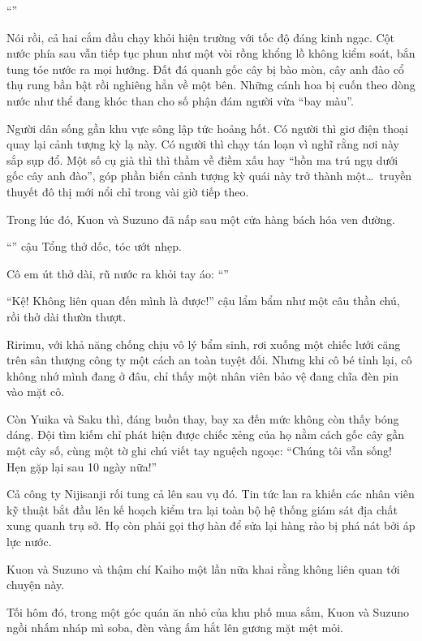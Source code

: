 \documentclass[../main.tex]{subfiles}
\begin{document}
``''

Nói rồi, cả hai cắm đầu chạy khỏi hiện trường với tốc độ đáng kinh ngạc. Cột nước phía sau vẫn tiếp tục phun như một vòi rồng khổng lồ không kiểm soát, bắn tung tóe nước ra mọi hướng. Đất đá quanh gốc cây bị bào mòn, cây anh đào cổ thụ rung bần bật rồi nghiêng hẳn về một bên. Những cánh hoa bị cuốn theo dòng nước như thể đang khóc than cho số phận đám người vừa ``bay màu''.

Người dân sống gần khu vực sông lập tức hoảng hốt. Có người thì giơ điện thoại quay lại cảnh tượng kỳ lạ này. Có người thì chạy tán loạn vì nghĩ rằng  nơi này sắp sụp đổ. Một số cụ già thì thì thầm về điềm xấu hay ``hồn ma trú ngụ dưới gốc cây anh đào'', góp phần biến cảnh tượng kỳ quái này trở thành một\dots\ truyền thuyết đô thị mới nổi chỉ trong vài giờ tiếp theo.

Trong lúc đó, Kuon và Suzuno đã nấp sau một cửa hàng bách hóa ven đường.

``'' cậu Tổng thở dốc, tóc ướt nhẹp.

Cô em út thở dài, rũ nước ra khỏi tay áo: ``''

``Kệ! Không liên quan đến mình là được!'' cậu lẩm bẩm như một câu thần chú, rồi thở dài thườn thượt.

Ririmu, với khả năng chống chịu vô lý bẩm sinh, rơi xuống một chiếc lưới căng trên sân thượng công ty một cách an toàn tuyệt đối. Nhưng khi cô bé tỉnh lại, cô không nhớ mình đang ở đâu, chỉ thấy một nhân viên bảo vệ đang chĩa đèn pin vào mặt cô.

Còn Yuika và Saku thì, đáng buồn thay, bay xa đến mức không còn thấy bóng dáng. Đội tìm kiếm chỉ phát hiện được chiếc xẻng của họ nằm cách gốc cây gần một cây số, cùng một tờ ghi chú viết tay nguệch ngoạc: ``Chúng tôi vẫn sống! Hẹn gặp lại sau 10 ngày nữa!''

Cả công ty Nijisanji rối tung cả lên sau vụ đó. Tin tức lan ra khiến các nhân viên kỹ thuật bắt đầu lên kế hoạch kiểm tra lại toàn bộ hệ thống giám sát địa chất xung quanh trụ sở. Họ còn phải gọi thợ hàn để sửa lại hàng rào bị phá nát bởi áp lực nước.

Kuon và Suzuno và thậm chí Kaiho một lần nữa khai rằng không liên quan tới chuyện này.

\ct

Tối hôm đó, trong một góc quán ăn nhỏ của khu phố mua sắm, Kuon và Suzuno ngồi nhấm nháp mì soba, đèn vàng ấm hắt lên gương mặt mệt mỏi.
\end{document}
